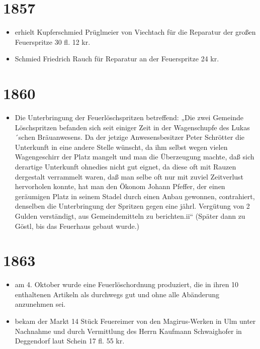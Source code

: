 \documentclass[12pt,a4paper]{book}
\begin{document}
\section*{1857}

\begin{itemize}
\item erhielt Kupferschmied Prüglmeier von Viechtach für die Reparatur der
großen Feuerspritze 30 fl. 12 kr.

\item Schmied Friedrich Rauch für Reparatur an der Feuerspritze 24 kr.
\end{itemize}

\section*{1860}

\begin{itemize}
\item Die Unterbringung der Feuerlöschspritzen betreffend: „Die zwei Gemeinde
Löschspritzen befanden sich seit einiger Zeit in der Wagenschupfe des
Lukas´schen Bräuanwesens. Da der jetzige Anwesensbesitzer Peter Schrötter die
Unterkunft in eine andere Stelle wünscht, da ihm selbst wegen vielen
Wagengeschirr der Platz mangelt und man die Überzeugung machte, daß sich
derartige Unterkunft ohnedies nicht gut eignet, da diese oft mit Rauzen
dergestalt verrammelt waren, daß man selbe oft nur mit zuviel Zeitverlust
hervorholen konnte, hat man den Ökonom Johann Pfeffer, der einen geräumigen
Platz in seinem Stadel durch einen Anbau gewonnen, contrahiert, denselben die
Unterbringung der Spritzen gegen eine jährl. Vergütung von 2 Gulden verständigt,
aus Gemeindemitteln zu berichten.ii“ (Später dann zu Göstl, bis das Feuerhaus
gebaut wurde.)
\end{itemize}

\section*{1863}

\begin{itemize}
\item am 4. Oktober wurde eine Feuerlöschordnung produziert, die in ihren 10
enthaltenen Artikeln als durchwegs gut und ohne alle Abänderung anzunehmen sei.

\item bekam der Markt 14 Stück Feuereimer von den Magirus-Werken in Ulm unter
Nachnahme und durch Vermittlung des Herrn Kaufmann Schwaighofer in Deggendorf
laut Schein 17 fl. 55 kr.
\end{itemize}
\end{document}

